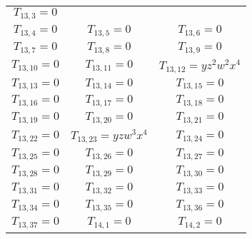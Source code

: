 \begin{longtable}{|c|c|c|}
$T_{13,3}= 0$\\

$T_{13,4}= 0$&

$T_{13,5}= 0$&

$T_{13,6}= 0$\\

$T_{13,7}= 0$&

$T_{13,8}= 0$&

$T_{13,9}= 0$\\

$T_{13,10}= 0$&

$T_{13,11}= 0$&

$T_{13,12}= yz^2w^2x^4$\\

$T_{13,13}= 0$&

$T_{13,14}= 0$&

$T_{13,15}= 0$\\

$T_{13,16}= 0$&

$T_{13,17}= 0$&

$T_{13,18}= 0$\\

$T_{13,19}= 0$&

$T_{13,20}= 0$&

$T_{13,21}= 0$\\

$T_{13,22}= 0$&

$T_{13,23}= yzw^3x^4$&

$T_{13,24}= 0$\\

$T_{13,25}= 0$&

$T_{13,26}= 0$&

$T_{13,27}= 0$\\

$T_{13,28}= 0$&

$T_{13,29}= 0$&

$T_{13,30}= 0$\\

$T_{13,31}= 0$&

$T_{13,32}= 0$&

$T_{13,33}= 0$\\

$T_{13,34}= 0$&

$T_{13,35}= 0$&

$T_{13,36}= 0$\\

$T_{13,37}= 0$&

$T_{14,1}= 0$&

$T_{14,2}= 0$\\


\end{longtable}
